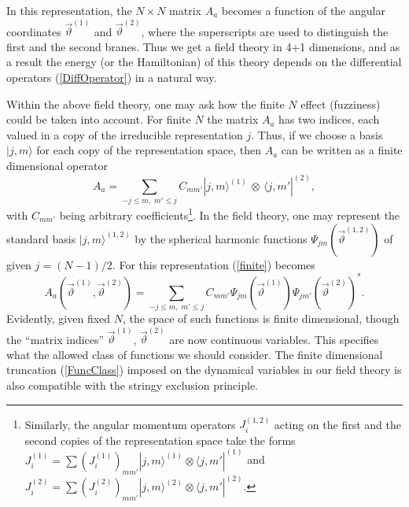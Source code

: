 \documentclass[a4paper,12pt]{article}
\begin{document}
In this representation, the $N\times N$ matrix $A_{a}$ becomes a function of the angular coordinates $\vec{\vartheta}^{(1)}$ and $\vec{\vartheta}^{(2)}$, where the superscripts are used to distinguish the first and the second branes. Thus we get a field theory in 4+1 dimensions, and as a result the energy (or the Hamiltonian) of this theory depends on the differential operators (\ref{DiffOperator}) in a natural way.

Within the above field theory, one may ask how the finite $N$ effect (fuzziness) could be taken into account. For finite $N$ the matrix $A_{a}$ has two indices, each valued in a copy of the irreducible representation $j$. Thus, if we choose a basis $|j,m\rangle$ for each copy of the representation space, then $A_{a}$ can be written as a finite dimensional operator
\begin{equation}
A_{a}=\sum_{-j\leq m,\;m'\leq j}C_{mm'}|j,m\rangle^{(1)}\,\otimes\,\langle j,m'|^{(2)},
\label{finite}
\end{equation}
with $C_{mm'}$ being arbitrary coefficients\footnote{Similarly, the angular momentum operators $J^{(1,2)}_{i}$ acting on the first and the second copies of the representation space take the forms $J^{(1)}_{i}=\sum(J^{(1)}_{i})_{mm'}
|j,m\rangle^{(1)}\otimes\langle j,m'|^{(1)}$ and $J^{(2)}_{i}=\sum(J^{(2)}_{i})_{mm'}
|j,m\rangle^{(2)}\otimes\langle j,m'|^{(2)}$.}. In the field theory, one may represent the standard basis $|j,m\rangle^{(1,2)}$ by the spherical harmonic functions $\Psi_{jm}(\vec{\vartheta}^{(1,2)})$ of given $j=(N-1)/2$. For this representation (\ref{finite}) becomes
\begin{equation}
A_{a}(\vec{\vartheta}^{(1)},\vec{\vartheta}^{(2)})=\sum_{-j\leq m,\;m'\leq j}C_{mm'}\Psi_{jm}(\vec{\vartheta}^{(1)})\Psi_{jm'}(\vec{\vartheta}^{(2)})^{*}.
\label{FuncClass}
\end{equation}
Evidently, given fixed $N$, the space of such functions is finite dimensional, though the ``matrix indices'' $\vec{\vartheta}^{(1)}$, $\vec{\vartheta}^{(2)}$ are now continuous variables. This specifies what the allowed class of functions we should consider. The finite dimensional truncation (\ref{FuncClass}) imposed on the dynamical variables in our field theory is also compatible with the stringy exclusion principle.
\end{document}
